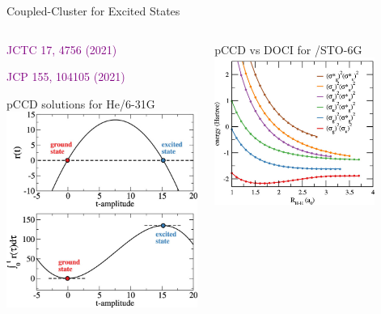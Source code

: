 \documentclass[aspectratio=169,9pt]{beamer}
\newcommand{\pub}[1]{{\small \textcolor{purple}{#1}}}
\begin{document}
\begin{frame}{Coupled-Cluster for Excited States}
\begin{columns}
                \begin{column}{0.35\textwidth}
		\pub{JCTC 17, 4756 (2021)}

		\pub{JCP 155, 104105 (2021)}
                        \begin{block}{pCCD solutions for He/6-31G}
                                \centering
                                \includegraphics[width=\textwidth]{fig/scan_t}
                        \end{block}
                \end{column}
                \begin{column}{0.40\textwidth}
                        \centering
                        \begin{block}{pCCD vs DOCI for /STO-6G}
                                \centering
                                \includegraphics[width=0.8\textwidth]{fig/pccd.jpeg}

\end{block}
\end{column}
\end{columns}
\end{frame}
\end{document}
